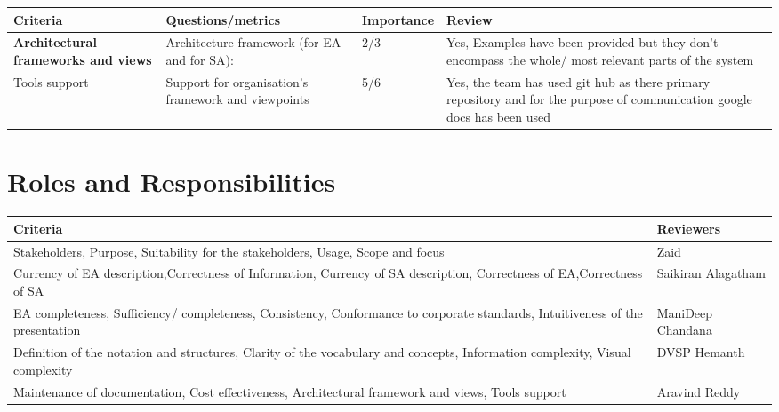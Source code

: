 \documentclass[
10pt, 
a4paper, 
oneside,
headinclude,footinclude,
BCOR5mm,
]{scrartcl}
\begin{document}
\begin{center}
 \begin{tabular}{|p{2cm}|p{4cm}|p{4cm}|p{4cm}| } 
\hline
\textbf{\textbf{Criteria}} & \textbf{Questions/metrics} & \textbf{Importance} & \textbf{Review}
\\ 
\hline
\textbf{Architectural frameworks and views} & Architecture framework (for EA and for SA): & 2/3 & Yes, Examples have been provided but they don’t encompass the whole/ most relevant parts of the system
 \\ 
 \hline{Tools support} & Support for organisation’s framework and viewpoints & 5/6 & Yes, the team has used git hub as there primary repository and for the purpose of communication google docs has been used
 \\ 
 \hline
 
 
\end{tabular}

\section{Roles and Responsibilities}
\begin{tabular}{|p{5cm}|p{5cm}| } 
\hline
\textbf{\textbf{Criteria}} & \textbf{Reviewers}   }\\
\hline
Stakeholders, Purpose, Suitability
for the
stakeholders, Usage, Scope and focus & Zaid \\
\hline
Currency of EA description,Correctness of
Information, Currency of SA description, Correctness of EA,Correctness of SA & Saikiran Alagatham \\
\hline
EA completeness, Sufficiency/
completeness, Consistency, Conformance to
corporate standards, Intuitiveness of the
presentation & ManiDeep Chandana \\
\hline
Definition of the notation and structures, Clarity of the
vocabulary and
concepts, Information
complexity, Visual complexity & DVSP Hemanth \\
\hline
Maintenance of
documentation, Cost effectiveness, Architectural
framework and
views, Tools support & Aravind Reddy \\
\hline
\end{tabular}
\end{center}
\end{document}
